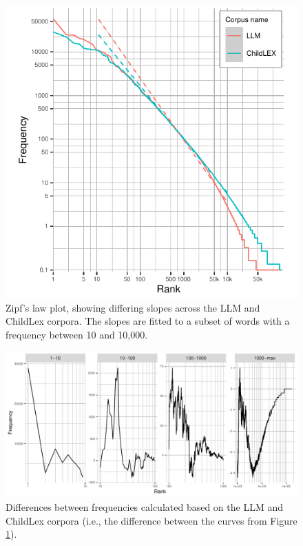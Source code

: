 \documentclass[jou, a4paper]{apa7}
\begin{document}
\begin{figure}[h]
  \centering
    \includegraphics[scale=.8]{figures/rankplot-normal-3.5-2.pdf}
    \caption{Zipf's law plot, showing differing slopes across the LLM and ChildLex corpora. The slopes are fitted to a subset of words with a frequency between 10 and 10,000. }
    \label{fig:rankplot-normal}
\end{figure}

\begin{figure}[t]
    \centering
    \includegraphics[scale=.8]{figures/rankplot-difs-3.5-2.pdf}
    \caption{Differences between frequencies calculated based on the LLM and ChildLex corpora (i.e., the difference between the curves from Figure \ref{fig:rankplot-normal}).}
    \label{fig:rankplot-difs}
\end{figure}
\end{document}
